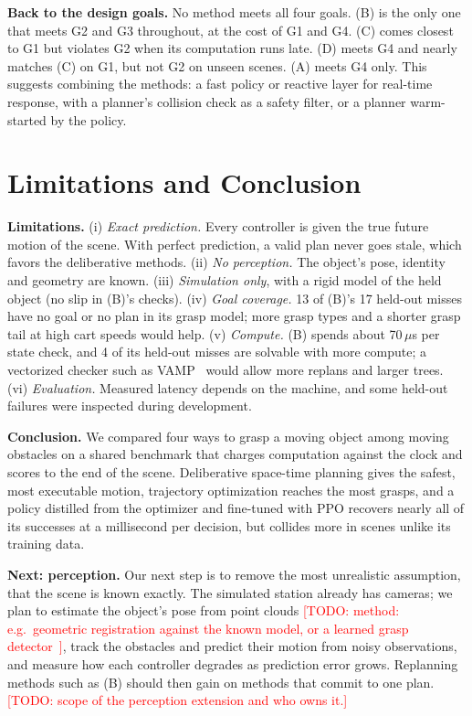 \documentclass[conference]{IEEEtran}
\newcommand{\todo}[1]{\textcolor{red}{[TODO: #1]}}
\begin{document}
\textbf{Back to the design goals.} No method meets all four goals. (B) is the only one that meets G2 and
G3 throughout, at the cost of G1 and G4. (C) comes closest to G1 but violates G2 when its computation
runs late. (D) meets G4 and nearly matches (C) on G1, but not G2 on unseen scenes. (A) meets G4 only.
This suggests combining the methods: a fast policy or reactive layer for real-time response, with a
planner's collision check as a safety filter, or a planner warm-started by the policy.

\section{Limitations and Conclusion}
\label{sec:conclusion}

\textbf{Limitations.}
(i) \emph{Exact prediction.} Every controller is given the true future motion of the scene. With perfect
prediction, a valid plan never goes stale, which favors the deliberative methods.
(ii) \emph{No perception.} The object's pose, identity and geometry are known.
(iii) \emph{Simulation only}, with a rigid model of the held object (no slip in (B)'s checks).
(iv) \emph{Goal coverage.} 13 of (B)'s 17 held-out misses have no goal or no plan in its grasp model;
more grasp types and a shorter grasp tail at high cart speeds would help.
(v) \emph{Compute.} (B) spends about 70\,$\mu$s per state check, and 4 of its held-out misses are
solvable with more compute; a vectorized checker such as VAMP~\cite{thomason2024vamp} would allow more
replans and larger trees.
(vi) \emph{Evaluation.} Measured latency depends on the machine, and some held-out failures were inspected
during development.

\textbf{Conclusion.} We compared four ways to grasp a moving object among moving obstacles on a shared
benchmark that charges computation against the clock and scores to the end of the scene. Deliberative
space-time planning gives the safest, most executable motion, trajectory optimization reaches the most
grasps, and a policy distilled from the optimizer and fine-tuned with PPO recovers nearly all of its
successes at a millisecond per decision, but collides more in scenes unlike its training data.

\textbf{Next: perception.} Our next step is to remove the most unrealistic assumption, that the scene is
known exactly. The simulated station already has cameras; we plan to estimate the object's pose from
point clouds \todo{method: e.g.\ geometric registration against the known model, or a learned grasp
detector~\cite{sundermeyer2021contactgraspnet,zhai2023monograspnet}}, track the obstacles and predict their
motion from noisy observations, and measure how each controller degrades as prediction error grows.
Replanning methods such as (B) should then gain on methods that commit to one plan.
\todo{scope of the perception extension and who owns it.}
\end{document}
